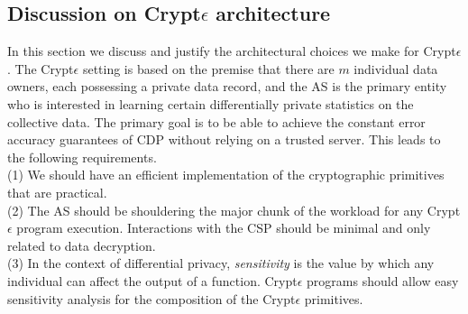 \subsection{Discussion on Crypt$\epsilon$ architecture}\label{architecture}
In this section we discuss and justify the architectural choices we make for Crypt$\epsilon$. The Crypt$\epsilon$ setting is based on the premise that there are $m$ individual data owners, each possessing a private data record, and the \textsf{AS} is the primary entity who is interested in learning certain differentially private statistics on the collective data. The primary goal is to be able to achieve the constant error accuracy guarantees of  \textsf{CDP} without relying on a trusted server. %
This leads to the following requirements.\\
(1) We should have an efficient implementation of the cryptographic primitives that are practical.\\
(2) The \textsf{AS} should be shouldering the major chunk of the workload for any Crypt$\epsilon$ program execution. Interactions with the \textsf{CSP} should be minimal and only related to data decryption.\\
(3) In the context of differential privacy, \emph{sensitivity} is the value by which any individual can affect the output of a function. Crypt$\epsilon$ programs should allow easy sensitivity analysis for the composition of the Crypt$\epsilon$ primitives. \\
